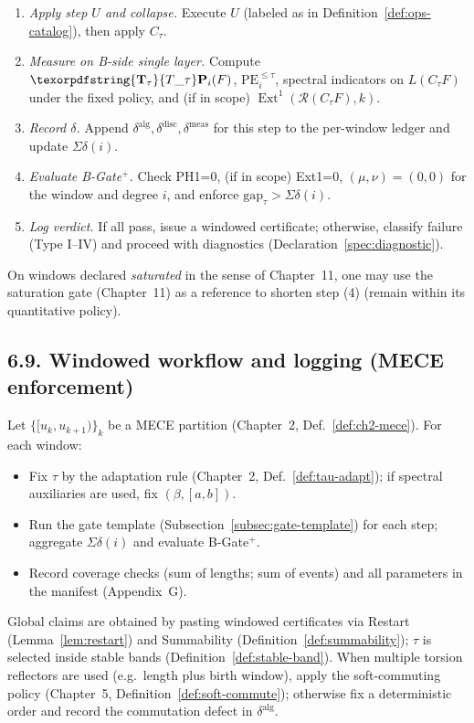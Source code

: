 \documentclass[11pt]{article}
\DeclareMathOperator{\Ext}{Ext}
\DeclareRobustCommand{\hyp}{\nobreakdash-}
\newcommand{\Rfun}{\mathcal{R}}
\numberwithin{equation}{section}
\theoremstyle{definition}
\DeclareRobustCommand{\Ttau}{\texorpdfstring{\ensuremath{\mathbf{T}_{\tau}}}{T\_\tau}}
\begin{document}
\begin{enumerate}
  \item \emph{Apply step $U$ and collapse.} Execute $U$ (labeled as in Definition~\ref{def:ops-catalog}), then apply $C_\tau$.
  \item \emph{Measure on B\hyp side single layer.} Compute $\Ttau\mathbf{P}_i(F)$, $\mathrm{PE}_i^{\le\tau}$, spectral indicators on $L(C_\tau F)$ under the fixed policy, and (if in scope) $\Ext^1(\Rfun(C_\tau F),k)$.
  \item \emph{Record $\delta$.} Append $\delta^{\mathrm{alg}},\delta^{\mathrm{disc}},\delta^{\mathrm{meas}}$ for this step to the per\hyp window ledger and update $\Sigma\delta(i)$.
  \item \emph{Evaluate B\hyp Gate$^{+}$.} Check PH1=0, (if in scope) Ext1=0, $(\mu,\nu)=(0,0)$ for the window and degree $i$, and enforce $\mathrm{gap}_\tau>\Sigma\delta(i)$.
  \item \emph{Log verdict.} If all pass, issue a windowed certificate; otherwise, classify failure (Type I–IV) and proceed with diagnostics (Declaration~\ref{spec:diagnostic}).
\end{enumerate}
On windows declared \emph{saturated} in the sense of Chapter~11, one may use the saturation gate (Chapter~11) as a reference to shorten step (4) (remain within its quantitative policy).

\subsection*{6.9. Windowed workflow and logging (MECE enforcement)}\label{subsec:window-workflow}
Let \(\{[u_k,u_{k+1})\}_k\) be a MECE partition (Chapter~2, Def.~\ref{def:ch2-mece}). For each window:
\begin{itemize}
  \item Fix \(\tau\) by the adaptation rule (Chapter~2, Def.~\ref{def:tau-adapt}); if spectral auxiliaries are used, fix \((\beta,[a,b])\).
  \item Run the gate template (Subsection~\ref{subsec:gate-template}) for each step; aggregate $\Sigma\delta(i)$ and evaluate B\hyp Gate$^{+}$.
  \item Record coverage checks (sum of lengths; sum of events) and all parameters in the manifest (Appendix~G).
\end{itemize}
Global claims are obtained by pasting windowed certificates via Restart (Lemma~\ref{lem:restart}) and Summability (Definition~\ref{def:summability}); $\tau$ is selected inside stable bands (Definition~\ref{def:stable-band}). When multiple torsion reflectors are used (e.g.\ length plus birth window), apply the soft\hyp commuting policy (Chapter~5, Definition~\ref{def:soft-commute}); otherwise fix a deterministic order and record the commutation defect in $\delta^{\mathrm{alg}}$.
\end{document}

